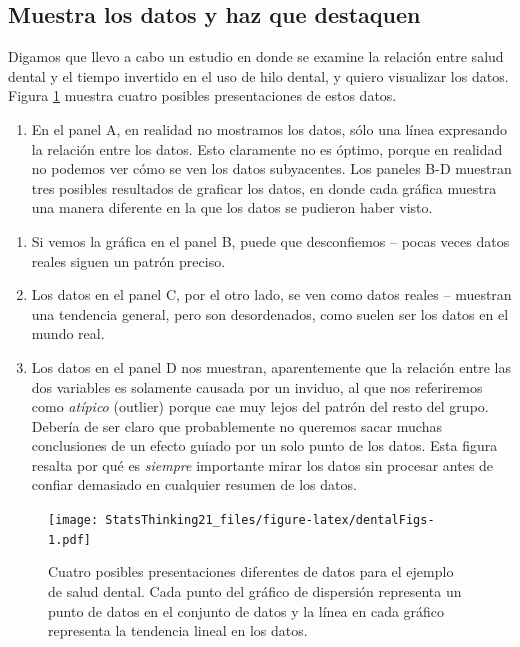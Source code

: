 \documentclass[
  12pt,
]{book}
\providecommand{\tightlist}{%
  \setlength{\itemsep}{0pt}\setlength{\parskip}{0pt}}
\begin{document}
\hypertarget{muestra-los-datos-y-haz-que-destaquen}{%
\subsection{Muestra los datos y haz que destaquen}\label{muestra-los-datos-y-haz-que-destaquen}}

Digamos que llevo a cabo un estudio en donde se examine la relación entre salud dental y el tiempo invertido en el uso de hilo dental, y quiero visualizar los datos. Figura \ref{fig:dentalFigs} muestra cuatro posibles presentaciones de estos datos.

\begin{enumerate}
\def\labelenumi{\arabic{enumi}.}
\tightlist
\item
  En el panel A, en realidad no mostramos los datos, sólo una línea expresando la relación entre los datos. Esto claramente no es óptimo, porque en realidad no podemos ver cómo se ven los datos subyacentes.
  Los paneles B-D muestran tres posibles resultados de graficar los datos, en donde cada gráfica muestra una manera diferente en la que los datos se pudieron haber visto.
\end{enumerate}

\begin{enumerate}
\def\labelenumi{\arabic{enumi}.}
\setcounter{enumi}{1}
\item
  Si vemos la gráfica en el panel B, puede que desconfiemos -- pocas veces datos reales siguen un patrón preciso.
\item
  Los datos en el panel C, por el otro lado, se ven como datos reales -- muestran una tendencia general, pero son desordenados, como suelen ser los datos en el mundo real.
\item
  Los datos en el panel D nos muestran, aparentemente que la relación entre las dos variables es solamente causada por un inviduo, al que nos referiremos como \emph{atípico} (outlier) porque cae muy lejos del patrón del resto del grupo. Debería de ser claro que probablemente no queremos sacar muchas conclusiones de un efecto guiado por un solo punto de los datos. Esta figura resalta por qué es \emph{siempre} importante mirar los datos sin procesar antes de confiar demasiado en cualquier resumen de los datos.
\end{enumerate}

\begin{figure}
\centering
\texttt{[image: StatsThinking21\_files/figure-latex/dentalFigs-1.pdf]}
\caption{\label{fig:dentalFigs}Cuatro posibles presentaciones diferentes de datos para el ejemplo de salud dental. Cada punto del gráfico de dispersión representa un punto de datos en el conjunto de datos y la línea en cada gráfico representa la tendencia lineal en los datos.}
\end{figure}
\end{document}
